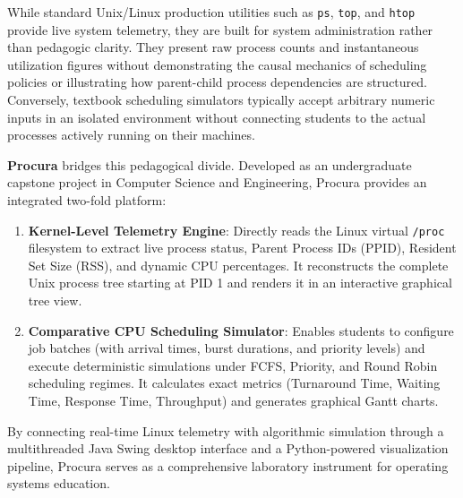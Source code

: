 \documentclass[12pt,a4paper]{article}
\begin{document}
While standard Unix/Linux production utilities such as \texttt{ps}, \texttt{top}, and \texttt{htop} provide live system telemetry, they are built for system administration rather than pedagogic clarity. They present raw process counts and instantaneous utilization figures without demonstrating the causal mechanics of scheduling policies or illustrating how parent-child process dependencies are structured. Conversely, textbook scheduling simulators typically accept arbitrary numeric inputs in an isolated environment without connecting students to the actual processes actively running on their machines.

\textbf{Procura} bridges this pedagogical divide. Developed as an undergraduate capstone project in Computer Science and Engineering, Procura provides an integrated two-fold platform:
\begin{enumerate}
    \item \textbf{Kernel-Level Telemetry Engine}: Directly reads the Linux virtual \texttt{/proc} filesystem to extract live process status, Parent Process IDs (PPID), Resident Set Size (RSS), and dynamic CPU percentages. It reconstructs the complete Unix process tree starting at PID 1 and renders it in an interactive graphical tree view.
    \item \textbf{Comparative CPU Scheduling Simulator}: Enables students to configure job batches (with arrival times, burst durations, and priority levels) and execute deterministic simulations under FCFS, Priority, and Round Robin scheduling regimes. It calculates exact metrics (Turnaround Time, Waiting Time, Response Time, Throughput) and generates graphical Gantt charts.
\end{enumerate}

By connecting real-time Linux telemetry with algorithmic simulation through a multithreaded Java Swing desktop interface and a Python-powered visualization pipeline, Procura serves as a comprehensive laboratory instrument for operating systems education.
\end{document}
